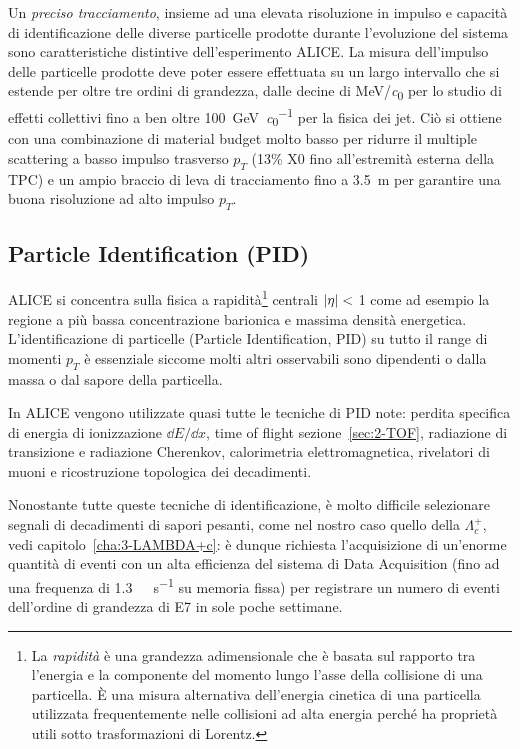         Un \textit{preciso tracciamento}, insieme ad una elevata risoluzione in impulso e capacità di identificazione delle diverse particelle prodotte durante l’evoluzione del sistema sono caratteristiche distintive dell’esperimento ALICE. La misura dell’impulso delle particelle prodotte deve poter essere effettuata su un largo intervallo che si estende per oltre tre ordini di grandezza, dalle decine di \unit[per-mode = symbol]{\mega \eV \per \clight} per lo studio di effetti collettivi fino a ben oltre \qty[per-mode = symbol]{100}{\giga \eV \per \clight} per la fisica dei jet. Ciò si ottiene con una combinazione di material budget molto basso per ridurre il multiple scattering a basso impulso trasverso $p_{T}$ (13\% X0 fino all’estremità esterna della TPC) e un ampio braccio di leva di tracciamento fino a \qty{3.5}{\meter} per garantire una buona risoluzione ad alto impulso $p_{T}$.

    \subsection{Particle Identification (PID)}
        ALICE si concentra sulla fisica a rapidità\footnote{La \textit{rapidità} è una grandezza adimensionale che è basata sul rapporto tra l’energia e la componente del momento lungo l’asse della collisione di una particella. È una misura alternativa dell’energia cinetica di una particella utilizzata frequentemente nelle collisioni ad alta energia perché ha proprietà utili sotto trasformazioni di Lorentz.} centrali $\abs{\eta} <$ \num{1} come ad esempio la regione a più bassa concentrazione barionica e massima densità energetica. L’identificazione di particelle (Particle Identification, PID) su tutto il range di momenti $p_{T}$ è essenziale siccome molti altri osservabili sono dipendenti o dalla massa o dal sapore della particella.

        In ALICE vengono utilizzate quasi tutte le tecniche di PID note: perdita specifica di energia di ionizzazione $\dd{E}/\dd{x}$, time of flight sezione~\ref{sec:2-TOF}, radiazione di transizione e radiazione Cherenkov, calorimetria elettromagnetica, rivelatori di muoni e ricostruzione topologica dei decadimenti.

        Nonostante tutte queste tecniche di identificazione, è molto difficile selezionare segnali di decadimenti di sapori pesanti, come nel nostro caso quello della $\Lambda_{c}^{+}$, vedi capitolo~\ref{cha:3-LAMBDA+c}: è dunque richiesta l’acquisizione di un’enorme quantità di eventi con un alta efficienza del sistema di Data Acquisition (fino ad una frequenza di \qty[per-mode = symbol]{1.3}{\giga \byte \per \second} su memoria fissa) per registrare un numero di eventi dell’ordine di grandezza di \num{E7} in sole poche settimane.
        
